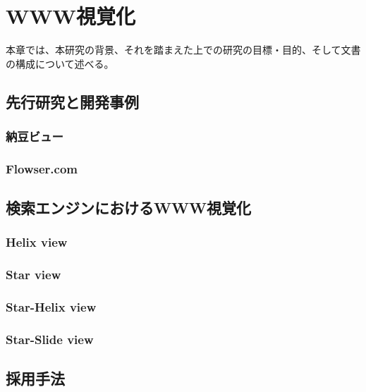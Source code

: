 \chapter{WWW視覚化}
\label{chap:visualize}

本章では、本研究の背景、それを踏まえた上での研究の目標・目的、そして文書の構成について述べる。

\section{先行研究と開発事例}

\subsection{納豆ビュー}

\subsection{Flowser.com}


\section{検索エンジンにおけるWWW視覚化}

\subsection{Helix view}

\subsection{Star view}

\subsection{Star-Helix view}

\subsection{Star-Slide view}


\section{採用手法}